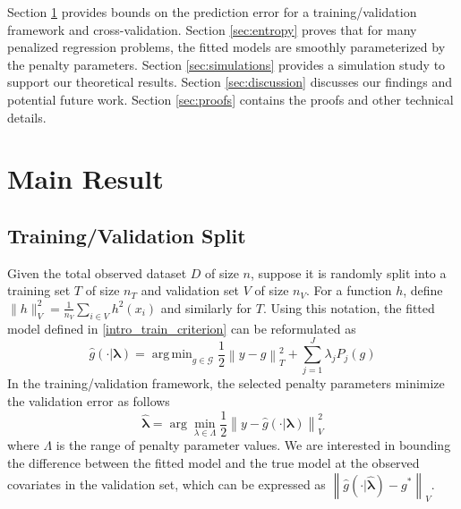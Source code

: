 \documentclass[12pt]{article}
\DeclareMathOperator*{\argmin}{arg\,min}
\begin{document}
Section \ref{sec:main_results} provides bounds on the prediction error for a training/validation framework and cross-validation.
Section \ref{sec:entropy} proves that for many penalized regression problems, the fitted models are smoothly parameterized by the penalty parameters.
Section \ref{sec:simulations} provides a simulation study to support our theoretical results.
Section \ref{sec:discussion} discusses our findings and potential future work.
Section \ref{sec:proofs} contains the proofs and other technical details.

\section{Main Result} \label{sec:main_results}

\subsection{Training/Validation Split}

Given the total observed dataset $D$ of size $n$, suppose it is randomly split into a training set $T$ of size $n_T$ and validation set $V$ of size $n_V$. For a function $h$, define $\| h \|_V^2 = \frac{1}{n_V}\sum_{i\in V} h^2(x_i)$ and similarly for $T$. Using this notation, the fitted model defined in  \eqref{intro_train_criterion} can be reformulated as
\begin{equation}
\hat{g}(\cdot | \boldsymbol \lambda) = \argmin_{g\in \mathcal{G}} \frac{1}{2} \left \|y -  g \right \|_T^2 + \sum_{j=1}^J \lambda_j P_j(g)
\end{equation}
In the training/validation framework, the selected penalty parameters minimize the validation error as follows
\begin{equation}
\label{cv_lambda}
\hat{\boldsymbol \lambda} = \arg\min_{\lambda\in\Lambda} \frac{1}{2} \left \| y-\hat{g}(\cdot | \boldsymbol \lambda) \right \|_{V}^{2}
\end{equation}
where $\Lambda$ is the range of penalty parameter values. We are interested in bounding the difference between the fitted model and the true model at the observed covariates in the validation set, which can be expressed as $\left \|\hat{g}(\cdot | \hat{\boldsymbol \lambda}) - g^* \right \|_V$.
\end{document}
